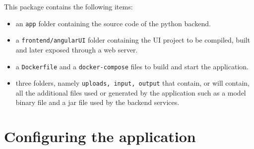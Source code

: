 \documentclass{scrreprt}
\begin{document}
This package contains the following items:
\begin{itemize}
	\item an \texttt{app} folder containing the source code of the python backend.
	\item a \texttt{frontend/angularUI} folder containing the UI project to be compiled, built and later exposed through a web server.
	\item a \texttt{Dockerfile} and a \texttt{docker-compose} files to build and start the application.
	\item three folders, namely \texttt{uploads, input, output} that contain, or will contain, all the additional files used or generated by the application such as a model binary file and a jar file used by the backend services.
\end{itemize}


\section{Configuring the application}
\end{document}
